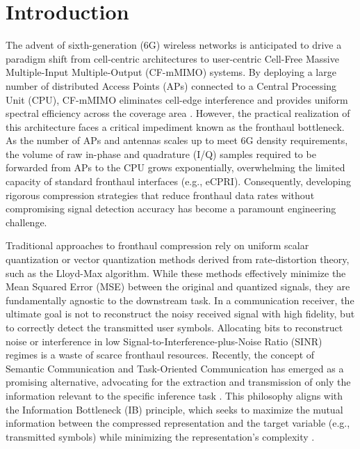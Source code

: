 \section{Introduction}

The advent of sixth-generation (6G) wireless networks is anticipated to drive a paradigm shift from cell-centric architectures to user-centric Cell-Free Massive Multiple-Input Multiple-Output (CF-mMIMO) systems. By deploying a large number of distributed Access Points (APs) connected to a Central Processing Unit (CPU), CF-mMIMO eliminates cell-edge interference and provides uniform spectral efficiency across the coverage area \cite{Polese2023Understanding, Rajapaksha2023Unsupervised}. However, the practical realization of this architecture faces a critical impediment known as the fronthaul bottleneck. As the number of APs and antennas scales up to meet 6G density requirements, the volume of raw in-phase and quadrature (I/Q) samples required to be forwarded from APs to the CPU grows exponentially, overwhelming the limited capacity of standard fronthaul interfaces (e.g., eCPRI). Consequently, developing rigorous compression strategies that reduce fronthaul data rates without compromising signal detection accuracy has become a paramount engineering challenge.

Traditional approaches to fronthaul compression rely on uniform scalar quantization or vector quantization methods derived from rate-distortion theory, such as the Lloyd-Max algorithm. While these methods effectively minimize the Mean Squared Error (MSE) between the original and quantized signals, they are fundamentally agnostic to the downstream task. In a communication receiver, the ultimate goal is not to reconstruct the noisy received signal with high fidelity, but to correctly detect the transmitted user symbols. Allocating bits to reconstruct noise or interference in low Signal-to-Interference-plus-Noise Ratio (SINR) regimes is a waste of scarce fronthaul resources. Recently, the concept of Semantic Communication and Task-Oriented Communication has emerged as a promising alternative, advocating for the extraction and transmission of only the information relevant to the specific inference task \cite{Lan2021SemanticComm, Wen2023Integration}. This philosophy aligns with the Information Bottleneck (IB) principle, which seeks to maximize the mutual information between the compressed representation and the target variable (e.g., transmitted symbols) while minimizing the representation's complexity \cite{Shao2021IBApproach, Shao2022Multidevice}.

